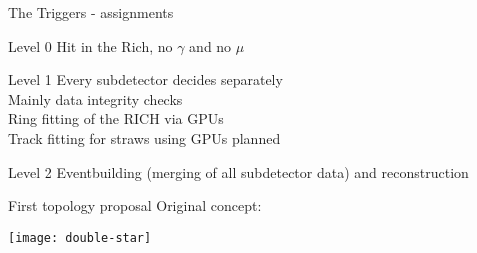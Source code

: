 \begin{frame}{The Triggers - assignments}{}
	\begin{block}{Level 0}
		Hit in the Rich, no $\gamma$ and no $\mu$
	\end{block}
	\begin{block}{Level 1}
		Every subdetector decides separately\\
		Mainly data integrity checks\\
		Ring fitting of the RICH via GPUs \\
		Track fitting for straws using GPUs planned
	\end{block}
	\begin{block}{Level 2}
		Eventbuilding (merging of all subdetector data) and reconstruction
	\end{block}
\end{frame}

\begin{frame}{First topology proposal}{}
	Original concept:
	\begin{center} 
		\texttt{[image: double-star]}
	\end{center}
\end{frame}
